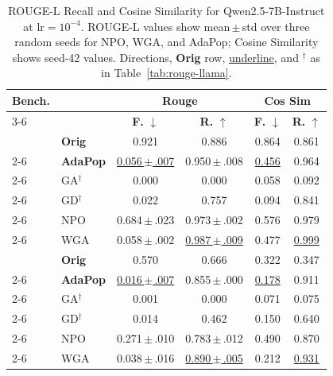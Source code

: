 \begin{table}[ht]
\centering
\footnotesize
\setlength{\tabcolsep}{2.5pt}
\begin{tabularx}{\linewidth}{|l|>{\centering\arraybackslash}X|c|c|c|c|}
\hline
\multirow{2}{*}{\textbf{Bench.}} & \multirow{2}{*}{\textbf{Algorithm}} & \multicolumn{2}{c|}{\textbf{Rouge}} & \multicolumn{2}{c|}{\textbf{Cos Sim}} \\ \cline{3-6}
 & & \textbf{F.} $\downarrow$ & \textbf{R.} $\uparrow$ & \textbf{F.} $\downarrow$ & \textbf{R.} $\uparrow$ \\ \hline
\rowcolor{cyan!15} \cellcolor{white} & \textbf{Orig} & 0.921 & 0.886 & 0.864 & 0.861 \\ \cline{2-6}
\rowcolor{violet!15} \cellcolor{white} & \textbf{AdaPop} & \underline{0.056{\tiny\,$\pm$\,.007}} & 0.950{\tiny\,$\pm$\,.008} & \underline{0.456} & 0.964 \\ \cline{2-6}
\rowcolor{gray!10} \cellcolor{white} & GA$^\dag$ & 0.000 & 0.000 & 0.058 & 0.092 \\ \cline{2-6}
\cellcolor{white} & GD$^\dag$ & 0.022 & 0.757 & 0.094 & 0.841 \\ \cline{2-6}
\rowcolor{gray!10} \cellcolor{white} & NPO & 0.684{\tiny\,$\pm$\,.023} & 0.973{\tiny\,$\pm$\,.002} & 0.576 & 0.979 \\ \cline{2-6}
\multirow{-6}{*}{\textbf{DUET}} \cellcolor{white} & WGA & 0.058{\tiny\,$\pm$\,.002} & \underline{0.987{\tiny\,$\pm$\,.009}} & 0.477 & \underline{0.999} \\ \hline
\rowcolor{cyan!15} \cellcolor{white} & \textbf{Orig} & 0.570 & 0.666 & 0.322 & 0.347 \\ \cline{2-6}
\rowcolor{violet!15} \cellcolor{white} & \textbf{AdaPop} & \underline{0.016{\tiny\,$\pm$\,.007}} & 0.855{\tiny\,$\pm$\,.000} & \underline{0.178} & 0.911 \\ \cline{2-6}
\rowcolor{gray!10} \cellcolor{white} & GA$^\dag$ & 0.001 & 0.000 & 0.071 & 0.075 \\ \cline{2-6}
\cellcolor{white} & GD$^\dag$ & 0.014 & 0.462 & 0.150 & 0.640 \\ \cline{2-6}
\rowcolor{gray!10} \cellcolor{white} & NPO & 0.271{\tiny\,$\pm$\,.010} & 0.783{\tiny\,$\pm$\,.012} & 0.490 & 0.870 \\ \cline{2-6}
\multirow{-6}{*}{\textbf{RWKU}} \cellcolor{white} & WGA & 0.038{\tiny\,$\pm$\,.016} & \underline{0.890{\tiny\,$\pm$\,.005}} & 0.212 & \underline{0.931} \\ \hline
\end{tabularx}
\caption{ROUGE-L Recall and Cosine Similarity for Qwen2.5-7B-Instruct at $\text{lr}=10^{-4}$. ROUGE-L values show mean\,$\pm$\,std over three random seeds for NPO, WGA, and AdaPop; Cosine Similarity shows seed-42 values. Directions, \textbf{Orig} row, \underline{underline}, and $^\dag$ as in Table~\ref{tab:rouge-llama}.}
\label{tab:rouge-qwen}
\end{table}

